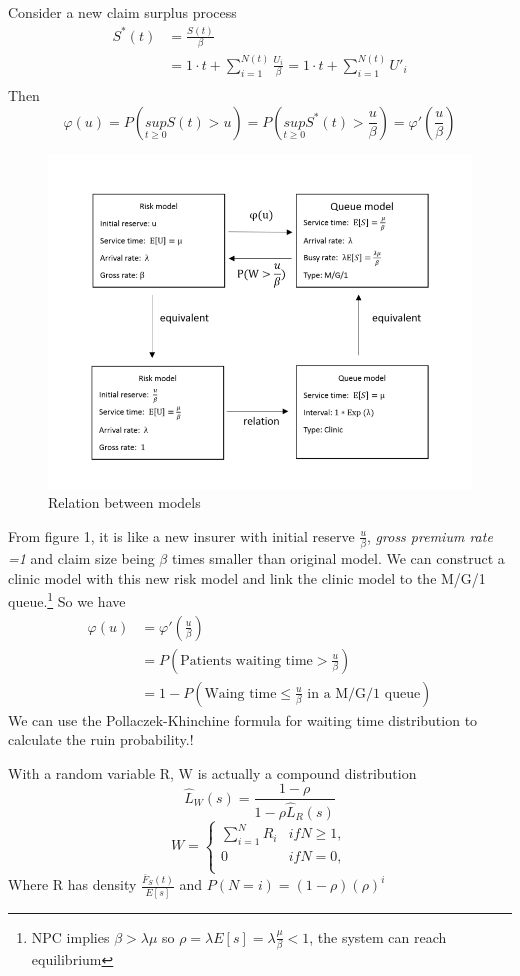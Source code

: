 \documentclass[project2.tex]{subfiles}
\begin{document}
Consider a new claim surplus process
\begin{align*}
S^*(t)&=\frac{S(t)}{\beta}\\
&=1\cdot t +\sum_{i=1}^{N(t)}\frac{U_i}{\beta}
=1\cdot t +\sum_{i=1}^{N(t)}U'_i\\
\end{align*}
Then $$\varphi(u)=P(\underset{t\geq 0}{sup}S(t)>u)=P(\underset{t\geq 0}{sup}S^*(t)>\frac{u}{\beta})=\varphi '(\frac{u}{\beta})$$
\begin{figure}[h]
\includegraphics[scale=1]{relation.png}
\caption{Relation between models}
\end{figure}
From figure 1, it is like a new insurer with initial reserve $\frac{u}{\beta}$, {\it gross premium rate =1} and claim size being $\beta$ times smaller than original model. We can construct a clinic model with this new risk model and link the clinic model to the M/G/1 queue.\footnote{NPC implies $\beta>\lambda\mu$ so $\rho=\lambda E[s]=\lambda\frac{\mu}{\beta}<1$, the system can reach equilibrium} So we have
\begin{align*}
\varphi(u)&=\varphi '(\frac{u}{\beta})\\
&=P(\text{Patients waiting time} > \frac{u}{\beta})\\
&=1-P(\text{Waing time} \leq \frac{u}{\beta} \text{ in a M/G/1 queue})
\end{align*}
We can use the Pollaczek-Khinchine formula for waiting time distribution to calculate the ruin probability.!
\begin{theorem}With a random variable R, W is actually a compound distribution
$$\hat{L}_W(s)=\frac{1-\rho}{1-\rho\hat{L}_R(s)}$$
\begin{equation*}
W= \left\{
\begin{array}{lcl}
\sum^{N}_{i=1} R_i  &if N\geq 1,\\
 0 &if N=0,\\
\end{array} 
\right.
\end{equation*}
Where R has density $\frac{\bar{F}_S(t)}{E[s]}$ and $P(N=i)=(1-\rho)(\rho)^i$
\end{theorem}
\end{document}
